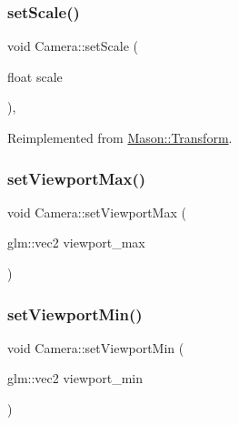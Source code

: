 \subsubsection{\texorpdfstring{set\+Scale()}{setScale()}}
{\footnotesize\ttfamily void Camera\+::set\+Scale (\begin{DoxyParamCaption}\item[{float}]{scale }\end{DoxyParamCaption})\hspace{0.3cm}{\ttfamily [override]}, {\ttfamily [virtual]}}



Reimplemented from \hyperlink{class_mason_1_1_transform_a498d685b66e2f73b88d3583ce55461c8}{Mason\+::\+Transform}.

\hypertarget{class_mason_1_1_camera_a1f9a7896bb617d1402e3c4738324e1ea}{}\label{class_mason_1_1_camera_a1f9a7896bb617d1402e3c4738324e1ea} 
\subsubsection{\texorpdfstring{set\+Viewport\+Max()}{setViewportMax()}}
{\footnotesize\ttfamily void Camera\+::set\+Viewport\+Max (\begin{DoxyParamCaption}\item[{glm\+::vec2}]{viewport\+\_\+max }\end{DoxyParamCaption})}

\hypertarget{class_mason_1_1_camera_aa630259d7e0c0124dec5c9aaf33b7160}{}\label{class_mason_1_1_camera_aa630259d7e0c0124dec5c9aaf33b7160} 
\subsubsection{\texorpdfstring{set\+Viewport\+Min()}{setViewportMin()}}
{\footnotesize\ttfamily void Camera\+::set\+Viewport\+Min (\begin{DoxyParamCaption}\item[{glm\+::vec2}]{viewport\+\_\+min }\end{DoxyParamCaption})}

\hypertarget{class_mason_1_1_camera_a27ff2d3ad004a49db2ae508ac6e9d3c2}{}\label{class_mason_1_1_camera_a27ff2d3ad004a49db2ae508ac6e9d3c2} 
